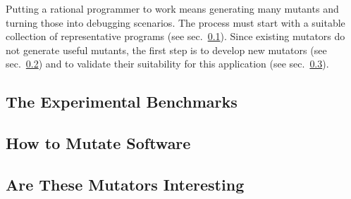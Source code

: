 
Putting a rational programmer to work means generating many mutants and turning
those into debugging scenarios. The process must start with a suitable
collection of representative programs (see sec.~\ref{sub:mutate-benchmarks}).
Since existing mutators do not generate useful mutants, the first step is to
develop new mutators (see sec.~\ref{sub:mutate-mutators}) and to validate their
suitability for this application (see sec.~\ref{sub:mutate-interesting}).


\def\sub#1#2{\subsection{#2} \label{sub:mutate-#1} }


\sub{benchmarks}{The Experimental Benchmarks}

\sub{mutators}   {How to Mutate Software} 
\sub{interesting}{Are These Mutators Interesting} 
